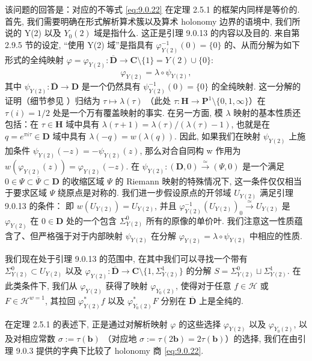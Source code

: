 \begin{remark}
该问题的回答是：对应的不等式 \eqref{eq:9.0.22} 在定理 2.5.1 的框架内同样是等价的. 
首先, 我们需要明确在形式解析算术簇以及算术 holonomy 边界的语境中, 
我们所说的 Y(2) 以及 \(Y_0(2)\) 域是指什么. 
这正是引理 9.0.13 的内容以及目的. 
来自第 2.9.5 节的设定, “使用 Y(2) 域”是指具有 \(\varphi^{-1}_{Y(2)}(0) = \{0\}\) 
的、从而分解为如下形式的全纯映射 \(\varphi = \varphi_{Y(2)} : \overline{\mathbf{D}} \to \mathbf{C} \setminus \{1\} = Y(2) \cup \{0\}\):
\[ \varphi_{Y(2)} = \lambda \circ \psi_{Y(2)}, \]
其中 \(\psi_{Y(2)}: \overline{\mathbf{D}} \to \mathbf{D}\) 是一个仍然具有 \(\psi_{Y(2)}^{-1}(0) = \{0\}\) 的全纯映射. 
这一分解的证明（细节参见 \cite[第 4.11、4.12 节]{Car54}）归结为 \(\tau \mapsto \lambda(\tau)\) （此处 \(\tau : \mathbf{H} \to \mathbf{P}^1 \setminus \{0,1,\infty\}\)）在 \(\tau(i) = 1/2\) 处是一个万有覆盖映射的事实. 
在另一方面, 模 \(\lambda\) 映射的基本性质还包括：在 \(\tau \in \mathbf{H}\) 域中具有 \(\lambda(\tau+1) = \lambda(\tau)/(\lambda(\tau)-1)\), 
也就是在 \(q = e^{\pi i \tau} \in \mathbf{D}\) 域中具有 \(\lambda(-q) = w(\lambda(q))\). 
因此, 如果我们在映射 \(\psi_{Y(2)}\) 上施加条件 \(\psi_{Y(2)}(-z) = -\psi_{Y(2)}(z)\), 
那么对合自同构 w 作用为 \(w(\varphi_{Y(2)}(z)) = \varphi_{Y(2)}(-z)\). 
在 \(\psi_{Y(2)} : (\mathbf{D}, 0) \xrightarrow{\simeq} (\Psi, 0)\) 是一个满足 \(0 \in \Psi \subset \overline{\Psi} \subset \mathbf{D}\) 
的收缩区域 \(\Psi\) 的 Riemann 映射的特殊情况下, 
这一条件仅仅相当于要求区域 \(\Psi\) 绕原点是对称的. 
我们进一步假设原点的开邻域 \(U_{Y(2)}\) 满足引理 9.0.13 的条件： 
即 \(w(U_{Y(2)}) = U_{Y(2)}\), 并且 \(\varphi_{Y(2)}^{-1} (U_{Y(2)})_0 \xrightarrow{\simeq} U_{Y(2)}\) 
是 \(\varphi_{Y(2)}\) 在 \(0 \in \mathbf{D}\) 处的一个包含 \(\Sigma_{Y(2)}^0\) 所有的原像的单价叶. 
我们注意这一性质蕴含了、但严格强于对于内部映射 \(\psi_{Y(2)}\) 在分解 \(\varphi_{Y(2)} = \lambda \circ \psi_{Y(2)}\) 中相应的性质.

我们现在处于引理 9.0.13 的范围中, 
在其中我们可以寻找一个带有 \(\Sigma^0_{Y(2)} \subset U_{Y(2)}\) 以及 \(\varphi_{Y(2)} : \overline{\mathbf{D}} \to \mathbf{C} \setminus \{1, \Sigma^1_{Y(2)}\}\) 
的分解 \(S = \Sigma^0_{Y(2)} \sqcup \Sigma^1_{Y(2)}\). 
在此类条件下, 我们从 \(\varphi_{Y(2)}\) 获得了映射 \(\varphi_{Y_0(2)}\), 
使得对于任意 \(f \in \mathcal{H}\) 或 \(F \in \mathcal{H}^{w=1}\), 
其拉回 \(\varphi^*_{Y(2)}f\) 以及 \(\varphi^*_{Y_0(2)}F\) 分别在 \(\overline{\mathbf{D}}\) 上是全纯的.

在定理 2.5.1 的表述下, 正是通过对解析映射 \(\varphi\) 的这些选择 \(\varphi_{Y(2)}\) 以及 \(\varphi_{Y_0(2)}\), 
以及对相应常数 \(\sigma := \tau(\mathbf{b})\) （对应地 \(\sigma := \tau(2\mathbf{b}) = 2\tau(\mathbf{b})\)）的选择, 
我们在由引理 9.0.3 提供的字典下比较了 holonomy 商 \eqref{eq:9.0.22}.


\end{remark}
